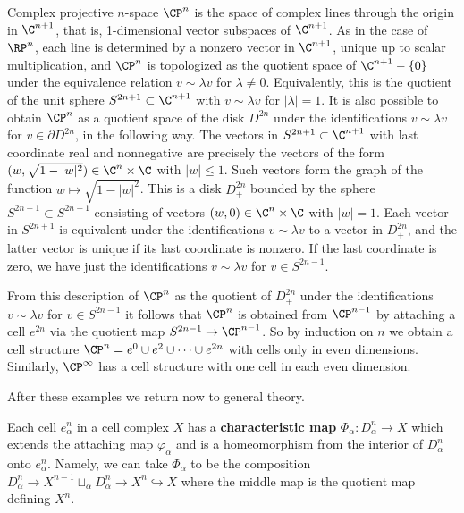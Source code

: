 \begin{example}
\label{ex:complex-projective-space-cw}
Complex projective $n$-space $\CP^n$ is the space of complex lines through the origin
in $\C^{n+1}$, that is, 1-dimensional vector subspaces of $\C^{n+1}$. As in the case of $\RP^n$,
each line is determined by a nonzero vector in $\C^{n+1}$, unique up to scalar
multiplication, and $\CP^n$ is topologized as the quotient space of $\C^{n+1} - \{0\}$ under the
equivalence relation $v \sim \lambda v$ for $\lambda \ne 0$. Equivalently, this is the quotient of the
unit sphere $S^{2n+1} \subset \C^{n+1}$ with $v \sim \lambda v$ for $|\lambda| = 1$. It is also possible to obtain
$\CP^n$ as a quotient space of the disk $D^{2n}$ under the identifications $v \sim \lambda v$ for
$v \in \partial D^{2n}$, in the following way. The vectors in $S^{2n+1} \subset \C^{n+1}$ with last
coordinate real and nonnegative are precisely the vectors of the form
$(w, \sqrt{1-|w|^2}) \in \C^n \times \C$ with $|w| \le 1$. Such vectors form the graph of the
function $w \mapsto \sqrt{1-|w|^2}$. This is a disk $D_+^{2n}$ bounded by the sphere
$S^{2n-1} \subset S^{2n+1}$ consisting of vectors $(w,0) \in \C^n \times \C$ with $|w| = 1$. Each vector in
$S^{2n+1}$ is equivalent under the identifications $v \sim \lambda v$ to a vector in $D_+^{2n}$, and the
latter vector is unique if its last coordinate is nonzero. If the last coordinate is zero,
we have just the identifications $v \sim \lambda v$ for $v \in S^{2n-1}$.

From this description of $\CP^n$ as the quotient of $D_+^{2n}$ under the identifications
$v \sim \lambda v$ for $v \in S^{2n-1}$ it follows that $\CP^n$ is obtained from $\CP^{n-1}$ by attaching a
cell $e^{2n}$ via the quotient map $S^{2n-1} \to \CP^{n-1}$. So by induction on $n$ we obtain a
cell structure $\CP^n = e^0 \cup e^2 \cup \cdots \cup e^{2n}$ with cells only in even dimensions.
Similarly, $\CP^\infty$ has a cell structure with one cell in each even dimension.
\end{example}

After these examples we return now to general theory.

\begin{definition}
\label{def:characteristic-map}
Each cell $e_\alpha^n$ in a cell complex $X$ has a \textbf{characteristic map}
$\Phi_\alpha : D_\alpha^n \to X$ which extends the attaching map $\varphi_\alpha$ and is a homeomorphism
from the interior of $D_\alpha^n$ onto $e_\alpha^n$. Namely, we can take $\Phi_\alpha$ to be the
composition $D_\alpha^n \to X^{n-1} \sqcup_\alpha D_\alpha^n \to X^n \hookrightarrow X$ where the middle map is the
quotient map defining $X^n$.
\end{definition}


